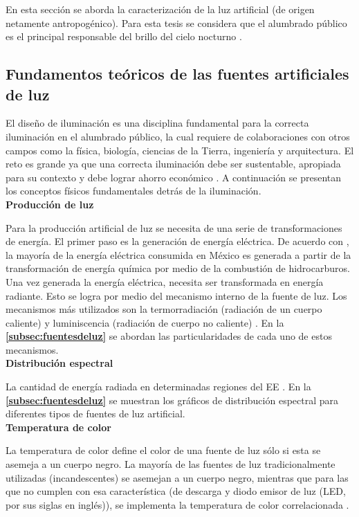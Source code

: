 En esta sección se aborda la caracterización de la luz artificial (de origen netamente antropogénico). Para esta tesis se considera que el alumbrado público es el principal responsable del brillo del cielo nocturno \citep{Solano2013b}.

\subsection{Fundamentos teóricos de las fuentes artificiales de luz}

El diseño de iluminación es una disciplina fundamental para la correcta iluminación en el alumbrado público, la cual requiere de colaboraciones con otros campos como la física, biología, ciencias de la Tierra, ingeniería y arquitectura. El reto es grande ya que una correcta iluminación debe ser sustentable, apropiada para su contexto y debe lograr ahorro económico \citep{LibroCL, Globaldiscussion}. A continuación se presentan los conceptos físicos fundamentales detrás de la iluminación.\\


\textbf{Producción de luz}

Para la producción artificial de luz se necesita de una serie de transformaciones de energía. El primer paso es la generación de energía eléctrica. De acuerdo con \cite{Ramos2012}, la mayoría de la energía eléctrica consumida en México es generada a partir de la transformación de energía química por medio de la combustión de hidrocarburos.\\

Una vez generada la energía eléctrica, necesita ser transformada en energía radiante. Esto se logra por medio del mecanismo interno de la fuente de luz. Los mecanismos más utilizados son la termorradiación (radiación de un cuerpo caliente) y luminiscencia (radiación de cuerpo no caliente) \citep{LibroCL}. En la \textbf{\autoref{subsec:fuentesdeluz}} se abordan las particularidades de cada uno de estos mecanismos.\\


\textbf{Distribución espectral}

La cantidad de energía radiada en determinadas regiones del EE \citep{Solano2013}. En la \textbf{\autoref{subsec:fuentesdeluz}} se muestran los gráficos de distribución espectral para diferentes tipos de fuentes de luz artificial.\\

  
\textbf{Temperatura de color}

La temperatura de color define el color de una fuente de luz sólo si esta se asemeja a un cuerpo negro. La mayoría de las fuentes de luz tradicionalmente utilizadas (incandescentes) se asemejan a un cuerpo negro, mientras que para las que no cumplen con esa característica (de descarga y diodo emisor de luz (LED, por sus siglas en inglés)), se implementa la temperatura de color correlacionada \citep{LibroCL}.\\

